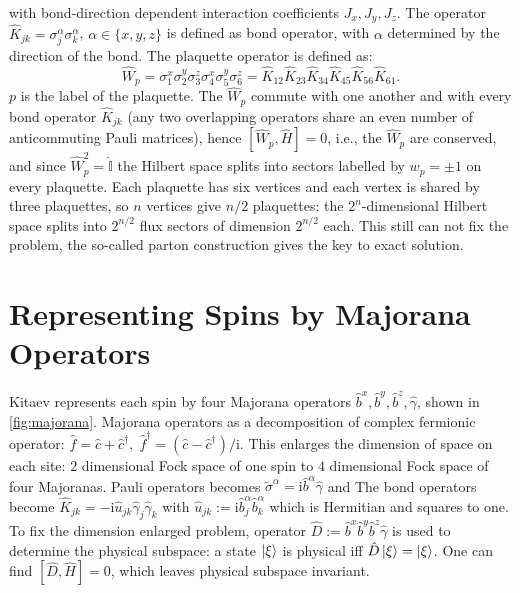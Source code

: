 \documentclass[
  aps,
  prl,
  reprint,
  amsmath,
  amssymb,
  superscriptaddress,
  floatfix
]{revtex4-2}
\newcommand{\oK}{\hat{K}}
\newcommand{\ii}{\mathrm{i}}
\renewcommand{\comm}[2]{\left[ #1 , #2 \right]}
\newcommand{\oH}{\hat{H}}
\newcommand{\oI}{\hat{\mathbb{I}}}
\renewcommand{\oc}{\hat{c}}
\newcommand{\oga}{\hat \gamma}
\newcommand{\obx}{\hat b^x}
\newcommand{\oby}{\hat b^y}
\newcommand{\obz}{\hat b^z}
\begin{document}
with bond-direction dependent interaction coefficients $J_x,J_y,J_z$.
The operator $\hat K_{jk} = \sigma^{\alpha}_j \sigma^{\alpha}_k$, $\alpha \in \{x,y,z\}$ is defined as bond operator, with $\alpha$ determined by the direction of the bond. The plaquette operator is defined as: 
\begin{equation}
  \hat{W}_p = \sigma_1^x \sigma_2^y \sigma_3^z
              \sigma_4^x \sigma_5^y \sigma_6^z
            = \oK_{12}\oK_{23}\oK_{34}\oK_{45}\oK_{56}\oK_{61}.
  \label{eq:Wp}
\end{equation}
$p$ is the label of the plaquette. The $\hat W_p$ commute with one another and
with every bond operator $\oK_{jk}$ (any two overlapping operators share an
even number of anticommuting Pauli matrices), hence $[\hat{W}_p, \oH] = 0$, i.e., 
the $\hat{W}_p$ are conserved, and since $\hat W_p^2 = \oI$ the Hilbert
space splits into sectors labelled by $w_p = \pm 1$ on every plaquette.
Each plaquette has six vertices and each vertex is shared by three
plaquettes, so $n$ vertices give $n/2$ plaquettes: the $2^n$-dimensional
Hilbert space splits into $2^{n/2}$ flux sectors of dimension $2^{n/2}$
each. This still can not fix the problem, the so-called parton construction gives the key to exact solution.

\section{Representing Spins by Majorana Operators}
\label{sec:method}
Kitaev represents each spin by four Majorana operators
$\obx,\oby,\obz,\oga$, shown in \cref{fig:majorana}. Majorana operators as a decomposition of complex fermionic operator: $\hat f = \oc + \oc^ \dag,\; \hat f^ \dag = (\oc -\oc^ \dag)/\ii$. 
This enlarges the dimension of space on each site: $2$ dimensional Fock space of one spin to $4$ dimensional Fock space of four Majoranas.
Pauli operators becomes $\tilde{\sigma}^ \alpha = \ii \hat b^ \alpha \oga$ and The bond operators become $\hat{K}_{jk} = - \ii \hat{u}_{jk} \oga_j \oga_k$ with $\hat{u}_{jk}:= \ii \hat{b}^\alpha_j\hat{b}^\alpha_k$ which is Hermitian and squares to one. To fix the dimension enlarged problem, operator $\hat{D}:= \obx \oby \obz \oga$ is used to determine the physical subspace: a state $\ket{\xi}$ is physical iff $\hat D \ket{\xi} = \ket{\xi}$. One can find $\comm{\hat D}{\oH} = 0$, which leaves physical subspace invariant. 
\end{document}
